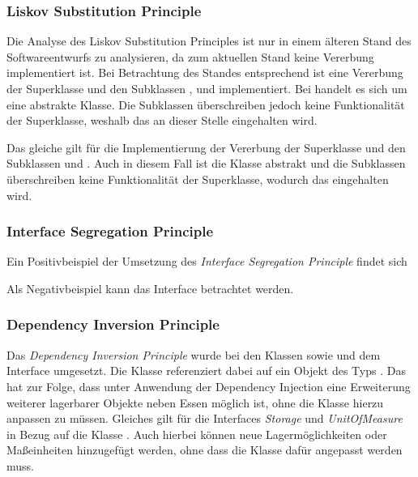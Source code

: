 \subsubsection*{Liskov Substitution Principle}

Die Analyse des Liskov Substitution Principles ist nur in einem älteren Stand des Softwareentwurfs zu analysieren, da zum aktuellen Stand keine Vererbung implementiert ist.
Bei Betrachtung des Standes entsprechend  ist eine Vererbung der Superklasse  und den Subklassen ,  und  implementiert.
Bei  handelt es sich um eine abstrakte Klasse.
Die Subklassen überschreiben jedoch keine Funktionalität der Superklasse, weshalb das  an dieser Stelle eingehalten wird.

Das gleiche gilt für die Implementierung der Vererbung der Superklasse  und den Subklassen  und .
Auch in diesem Fall ist die Klasse  abstrakt und die Subklassen überschreiben keine Funktionalität der Superklasse, wodurch das  eingehalten wird.

\subsubsection*{Interface Segregation Principle}

Ein Positivbeispiel der Umsetzung des \textit{Interface Segregation Principle} findet sich 

Als Negativbeispiel kann das Interface \code{} betrachtet werden. 

\subsubsection*{Dependency Inversion Principle}

Das \textit{Dependency Inversion Principle} wurde bei den Klassen  sowie  und dem Interface  umgesetzt.
Die Klasse  referenziert dabei auf ein Objekt des Typs . 
Das hat zur Folge, dass unter Anwendung der Dependency Injection eine Erweiterung weiterer lagerbarer Objekte neben Essen möglich ist, ohne die Klasse  hierzu anpassen zu müssen.
Gleiches gilt für die Interfaces \textit{Storage} und \textit{UnitOfMeasure} in Bezug auf die Klasse .
Auch hierbei können neue Lagermöglichkeiten oder Maßeinheiten hinzugefügt werden, ohne dass die Klasse  dafür angepasst werden muss.

